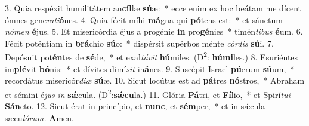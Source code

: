 3. Quia respéxit humilitátem an\textbf{cíl}læ \textbf{sú}æ: * ecce enim ex hoc beátam me dícent ómnes gene\textit{rati}\textbf{ó}nes.
4. Quia fécit míhi \textbf{má}gna qui \textbf{pó}tens est: * et sánctum \textit{nómen} \textbf{é}jus.
5. Et misericórdia éjus a progénie \textbf{in} pro\textbf{gé}nies * timén\textit{tibus} \textbf{é}um.
6. Fécit poténtiam in \textbf{brá}chio \textbf{sú}o: * dispérsit supérbos ménte \textit{córdis} \textbf{sú}i.
7. Depósuit pot\textbf{én}tes de \textbf{sé}de, * et exal\textit{távit} \textbf{hú}miles. (D\textsuperscript{2}: \textbf{húmi}les.)
8. Esuriéntes im\textbf{plé}vit \textbf{bó}nis: * et dívites dimí\textit{sit} in\textbf{á}nes.
9. Suscépit Israel \textbf{pú}erum \textbf{sú}um, * recordátus misericór\textit{diæ} \textbf{sú}æ.
10. Sicut locútus est ad \textbf{pá}tres \textbf{nó}stros, * Abraham et sémini é\textit{jus} \textit{in} \textbf{sǽ}cula. (D\textsuperscript{2}:\textbf{sǽcu}la.)
11. Glória \textbf{Pá}tri, et \textbf{Fí}lio, * et Spirí\textit{tui} \textbf{Sán}cto.
12. Sicut érat in princípio, et \textbf{nunc}, et \textbf{sém}per, * et in sǽcula sæcu\textit{lórum.} \textbf{A}men.
